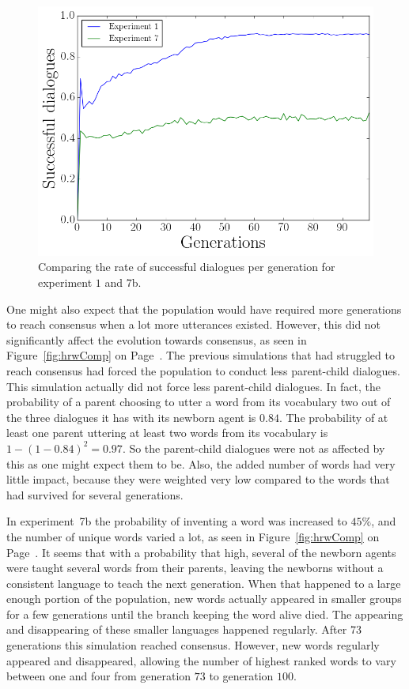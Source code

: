 \begin{figure}
    \centering
    \includegraphics[width=0.7\linewidth]{fig/Discussion/DialogueComparison}
    \caption{Comparing the rate of successful dialogues per generation for experiment $1$ and 7b.}
    \label{fig:DialogueComp}
\end{figure}

One might also expect that the population would have required more generations to reach consensus when a lot more utterances existed. However, this did not significantly affect the evolution towards consensus, as seen in Figure~\ref{fig:hrwComp} on Page~\pageref{fig:hrwComp}. The previous simulations that had struggled to reach consensus had forced the population to conduct less parent-child dialogues. This simulation actually did not force less parent-child dialogues. In fact, the probability of a parent choosing to utter a word from its vocabulary two out of the three dialogues it has with its newborn agent is $0.84$. The probability of at least one parent uttering at least two words from its vocabulary is $1 - (1-0.84)^2 = 0.97$. So the parent-child dialogues were not as affected by this as one might expect them to be. Also, the added number of words had very little impact, because they were weighted very low compared to the words that had survived for several generations. 

In experiment~7b the probability of inventing a word was increased to $45\%$, and the number of unique words varied a lot, as seen in Figure~\ref{fig:hrwComp} on Page~\pageref{fig:hrwComp}. It seems that with a probability that high, several of the newborn agents were taught several words from their parents, leaving the newborns without a consistent language to teach the next generation. When that happened to a large enough portion of the population, new words actually appeared in smaller groups for a few generations until the branch keeping the word alive died. The appearing and disappearing of these smaller languages happened regularly. After $73$ generations this simulation reached consensus. However, new words regularly appeared and disappeared, allowing the number of highest ranked words to vary between one and four from generation $73$ to generation $100$.

